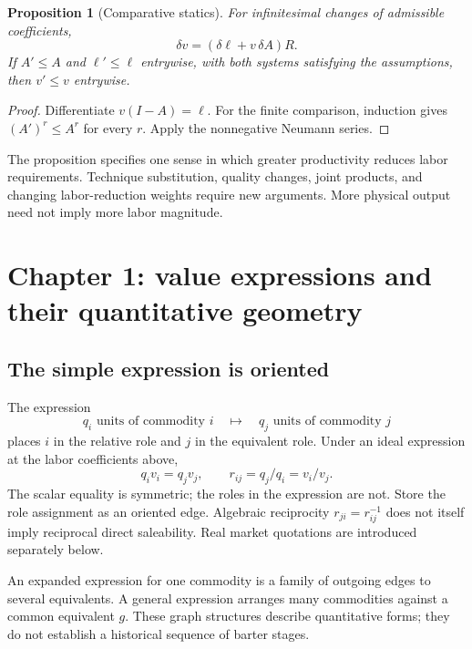 \documentclass[11pt,letterpaper]{article}
\newtheorem{proposition}{Proposition}[section]
\begin{document}
\begin{proposition}[Comparative statics]
For infinitesimal changes of admissible coefficients,
\begin{equation}\label{eq:sensitivity}
 \delta v=(\delta\ell+v\,\delta A)R.
\end{equation}
If $A'\le A$ and $\ell'\le\ell$ entrywise, with both systems satisfying
the assumptions, then $v'\le v$ entrywise.
\end{proposition}
\begin{proof}
Differentiate $v(I-A)=\ell$. For the finite comparison, induction gives
$(A')^r\le A^r$ for every $r$. Apply the nonnegative Neumann series.
\end{proof}
The proposition specifies one sense in which greater productivity
reduces labor requirements. Technique substitution, quality changes,
joint products, and changing labor-reduction weights require new
arguments. More physical output need not imply more labor magnitude.

\section{Chapter 1: value expressions and their quantitative geometry}
\subsection{The simple expression is oriented}
The expression
\[
 q_i\text{ units of commodity }i
 \quad\longmapsto\quad q_j\text{ units of commodity }j
\]
places $i$ in the relative role and $j$ in the equivalent role. Under an
ideal expression at the labor coefficients above,
\begin{equation}\label{eq:ratio}
 q_iv_i=q_jv_j,\qquad r_{ij}=q_j/q_i=v_i/v_j.
\end{equation}
The scalar equality is symmetric; the roles in the expression are not.
Store the role assignment as an oriented edge. Algebraic reciprocity
$r_{ji}=r_{ij}^{-1}$ does not itself imply reciprocal direct saleability.
Real market quotations are introduced separately below.

An expanded expression for one commodity is a family of outgoing
edges to several equivalents. A general expression arranges many
commodities against a common equivalent $g$. These graph structures
describe quantitative forms; they do not establish a historical sequence
of barter stages.
\end{document}
